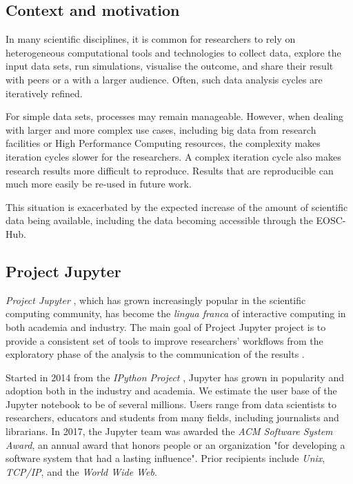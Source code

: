 \subsection{Context and motivation}

In many scientific disciplines, it is common for researchers to rely on
heterogeneous computational tools and technologies to collect data,
explore the input data sets, run simulations, visualise the outcome,
and share their result with peers or a with a larger audience. Often,
such data analysis cycles are iteratively refined.

For simple data sets, processes may remain manageable. However, when
dealing with larger and more complex use cases, including big data
from research facilities or High Performance Computing resources, the
complexity makes iteration cycles slower for the researchers. A
complex iteration cycle also makes research results more difficult to
reproduce. Results that are reproducible can much more easily be
re-used in future work.

This situation is exacerbated by the expected increase of the amount
of scientific data being available, including the data becoming
accessible through the EOSC-Hub.


%

\subsection{Project Jupyter}

\emph{Project Jupyter} \cite{Jupyter}, which has grown increasingly popular in the scientific
computing community, has become the \emph{lingua franca} of interactive
computing in both academia and industry. The main goal of Project Jupyter
project is to provide a consistent set of tools to improve researchers'
workflows from the exploratory phase of the analysis to the communication
of the results \cite{Kluyver2016}.

Started in 2014 from the \emph{IPython Project} \cite{IPython}, Jupyter has grown in
popularity and adoption both in the industry and academia. We estimate the user
base of the Jupyter notebook to be of several millions. Users range from data
scientists to researchers, educators and students from many fields,
including journalists and librarians. In 2017, the Jupyter
team was awarded the \emph{ACM Software System Award}, an annual award that
honors people or an organization "for developing a software system that had a
lasting influence". Prior recipients include \emph{Unix}, \emph{TCP/IP}, and
the \emph{World Wide Web}.

